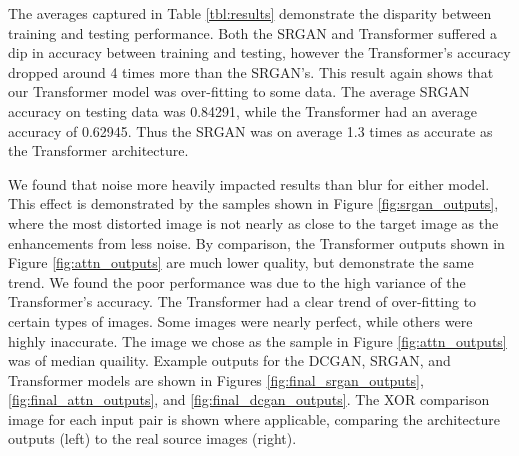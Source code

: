 \documentclass[letterpaper]{article} %
\begin{document}
The averages captured in Table \ref{tbl:results} demonstrate the disparity between training and testing performance.
Both the SRGAN and Transformer suffered a dip in accuracy between training and testing,
however the Transformer's accuracy dropped around 4 times more than the SRGAN's.
This result again shows that our Transformer model was over-fitting to some data.
The average SRGAN accuracy on testing data was 0.84291,
while the Transformer had an average accuracy of 0.62945.
Thus the SRGAN was on average 1.3 times as accurate as the Transformer architecture.

We found that noise more heavily impacted results than blur for either model.
This effect is demonstrated by the samples shown in Figure \ref{fig:srgan_outputs},
where the most distorted image is not nearly as close to the target image as the enhancements from less noise.
By comparison, the Transformer outputs shown in Figure \ref{fig:attn_outputs}
are much lower quality, but demonstrate the same trend.
We found the poor performance was due to the high variance of the Transformer's accuracy.
The Transformer had a clear trend of over-fitting to certain types of images.
Some images were nearly perfect, while others were highly inaccurate.
The image we chose as the sample in Figure \ref{fig:attn_outputs} was of median quaility.
Example outputs for the DCGAN, SRGAN, and Transformer models are
shown in Figures \ref{fig:final_srgan_outputs}, \ref{fig:final_attn_outputs}, and \ref{fig:final_dcgan_outputs}.
The XOR comparison image for each input pair is shown where applicable,
comparing the architecture outputs (left) to the real source images (right).
\end{document}

